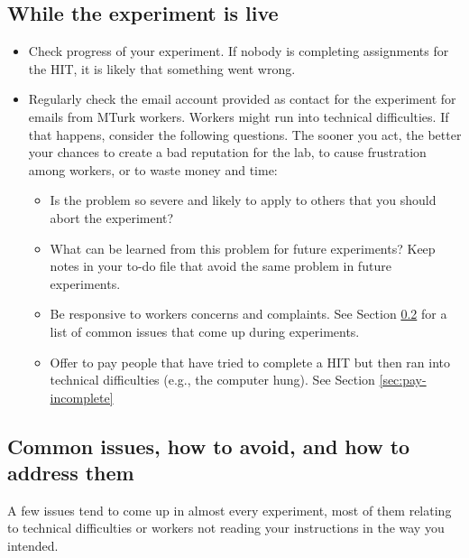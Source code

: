 \documentclass{article}
\begin{document}
\subsection{While the experiment is live}
\begin{tcolorbox}[colback=gray!5,colframe=blue!40!black,title=Monitoring while the experiment is in progress]
\begin{itemize}
    \item Check progress of your experiment. If nobody is completing assignments for the HIT, it is likely that something went wrong. %
    \item Regularly check the email account provided as contact for the experiment for emails from MTurk workers. Workers might run into technical difficulties. If that happens, consider the following questions. The sooner you act, the better your chances to create a bad reputation for the lab, to cause frustration among workers, or to waste money and time:
    \begin{itemize}
    	\item Is the problem so severe and likely to apply to others that you should abort the experiment?
	\item What can be learned from this problem for future experiments? Keep notes in your to-do file that avoid the same problem in future experiments.
	\item Be responsive to workers concerns and complaints.  See  Section \ref{sec:common-concerns} for a list of common issues that come up during experiments.
	\item Offer to pay people that have tried to complete a HIT but then ran into technical difficulties (e.g., the computer hung). See Section \ref{sec:pay-incomplete}
   \end{itemize}
\end{itemize}
\end{tcolorbox}

\subsection{Common issues, how to avoid, and how to address them}\label{sec:common-concerns}

A few issues tend to come up in almost every experiment, most of them relating to technical difficulties or workers not reading your instructions in the way you intended.
\end{document}
